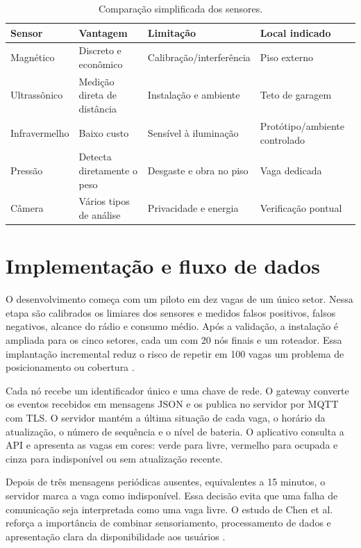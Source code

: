 \documentclass[11pt,a4paper]{article}
\begin{document}
\begin{table}[t]
\centering
\small
\caption{Comparação simplificada dos sensores.}
\begin{tabularx}{\textwidth}{L{2.2cm}YYY}
\toprule
Sensor & Vantagem & Limitação & Local indicado \\
\midrule
Magnético & Discreto e econômico & Calibração/interferência & Piso externo \\
Ultrassônico & Medição direta de distância & Instalação e ambiente & Teto de garagem \\
Infravermelho & Baixo custo & Sensível à iluminação & Protótipo/ambiente controlado \\
Pressão & Detecta diretamente o peso & Desgaste e obra no piso & Vaga dedicada \\
Câmera & Vários tipos de análise & Privacidade e energia & Verificação pontual \\
\bottomrule
\end{tabularx}
\end{table}

\section{Implementação e fluxo de dados}
O desenvolvimento começa com um piloto em dez vagas de um único setor. Nessa etapa são calibrados os limiares dos sensores e medidos falsos positivos, falsos negativos, alcance do rádio e consumo médio. Após a validação, a instalação é ampliada para os cinco setores, cada um com 20 nós finais e um roteador. Essa implantação incremental reduz o risco de repetir em 100 vagas um problema de posicionamento ou cobertura \cite{bagula2015}.

Cada nó recebe um identificador único e uma chave de rede. O gateway converte os eventos recebidos em mensagens JSON e os publica no servidor por MQTT com TLS. O servidor mantém a última situação de cada vaga, o horário da atualização, o número de sequência e o nível de bateria. O aplicativo consulta a API e apresenta as vagas em cores: verde para livre, vermelho para ocupada e cinza para indisponível ou sem atualização recente.

Depois de três mensagens periódicas ausentes, equivalentes a 15 minutos, o servidor marca a vaga como indisponível. Essa decisão evita que uma falha de comunicação seja interpretada como uma vaga livre. O estudo de Chen et al. reforça a importância de combinar sensoriamento, processamento de dados e apresentação clara da disponibilidade aos usuários \cite{chen2016}.
\end{document}
